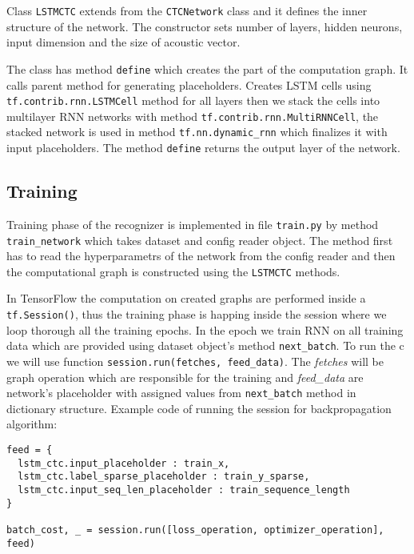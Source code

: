 Class \texttt{LSTMCTC} extends from the \texttt{CTCNetwork} class and it defines the inner structure of the network.
The constructor sets number of layers, hidden neurons, input dimension and the size of acoustic vector.

The class has method \texttt{define} which creates the part of the computation graph.
It calls parent method for generating placeholders.
Creates LSTM cells using \texttt{tf.contrib.rnn.LSTMCell} method for all layers then we stack the cells into multilayer RNN networks with method \texttt{tf.contrib.rnn.MultiRNNCell}, the stacked network is used in method \texttt{tf.nn.dynamic\_rnn} which finalizes it with input placeholders.
The method \texttt{define} returns the output layer of the network.

\subsection{Training}

Training phase of the recognizer is implemented in file \texttt{train.py} by method \texttt{train\_network} which takes dataset and config reader object.
The method first has to read the hyperparametrs of the network from the config reader and then the computational graph is constructed using the \texttt{LSTMCTC} methods.

In TensorFlow the computation on created graphs are performed inside a \texttt{tf.Session()}, thus the training phase is happing inside the session where we loop thorough all the training epochs.
In the epoch we train RNN on all training data which are provided using dataset object's method \texttt{next\_batch}.
To run the c we will use function \texttt{session.run(fetches, feed\_data)}. The \textit{fetches} will be graph operation which are responsible for the training and \textit{feed\_data} are network's placeholder with assigned values from \texttt{next\_batch} method in dictionary structure.
Example code of running the session for backpropagation algorithm:

\begin{lstlisting}
feed = {
  lstm_ctc.input_placeholder : train_x,
  lstm_ctc.label_sparse_placeholder : train_y_sparse,
  lstm_ctc.input_seq_len_placeholder : train_sequence_length
}

batch_cost, _ = session.run([loss_operation, optimizer_operation], feed)
\end{lstlisting}

